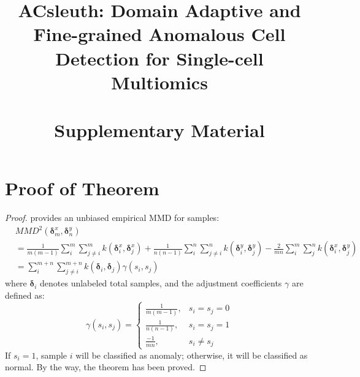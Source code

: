 \documentclass{article}
\title{\vspace{-2cm}\textbf{ACsleuth: Domain Adaptive and Fine-grained Anomalous Cell Detection for Single-cell Multiomics} \\
        ~\\
       \textbf{Supplementary Material}}
\author{}
\date{}
\begin{document}
\maketitle

\section{Proof of Theorem}
\begin{proof}
\cite{gretton2012kernel} provides an unbiased empirical MMD for samples:
\begin{equation}\label{eq:MMD_XY}
    \begin{aligned}
        & MMD^2\left(\bm{\delta}_m^x, \bm{\delta}_n^y\right)\\
        & = \frac{1}{m(m-1)}\sum_{i}^{m}\sum_{j\neq i}^{m}k(\bm{\delta}_i^x, \bm{\delta}_j^x)
          + \frac{1}{n(n-1)}\sum_{i}^{n}\sum_{j\neq i}^{n}k(\bm{\delta}_i^y, \bm{\delta}_j^y) - \frac{2}{mn}\sum_{i}^{m}\sum_{j}^{n}k(\bm{\delta}_i^x, \bm{\delta}_j^y) \\
        & = \sum_{i}^{m+n}\sum_{j\neq i}^{m+n}k(\bm{\delta}_i, \bm{\delta}_j)\gamma(s_i, s_j)
    \end{aligned}
\end{equation}
where $\bm{\delta}_i$ denotes unlabeled total samples, and the adjustment coefficients $\gamma$ are defined as:
\begin{equation}
    \gamma(s_i, s_j) =
    \begin{cases}
        \frac{1}{m(m-1)}, & s_i = s_j = 0 \\
        \frac{1}{n(n-1)}, & s_i = s_j = 1 \\
        \frac{-1}{mn}, & s_i \neq s_j
    \end{cases}
\end{equation}
If $s_i = 1$, sample $i$ will be classified as anomaly; otherwise, it will be classified as normal.
By the way, the theorem has been proved.
\end{proof}
\end{document}
